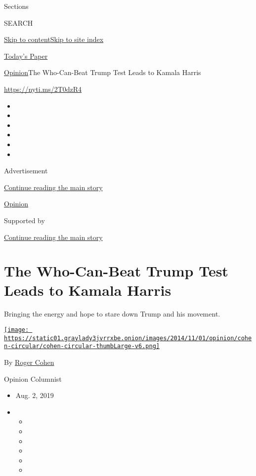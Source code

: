 Sections

SEARCH

\protect\hyperlink{site-content}{Skip to
content}\protect\hyperlink{site-index}{Skip to site index}

\href{https://myaccount.nytimes3xbfgragh.onion/auth/login?response_type=cookie\&client_id=vi}{}

\href{https://www.nytimes3xbfgragh.onion/section/todayspaper}{Today's
Paper}

\href{/section/opinion}{Opinion}\textbar{}The Who-Can-Beat Trump Test
Leads to Kamala Harris

\url{https://nyti.ms/2T0dzR4}

\begin{itemize}
\item
\item
\item
\item
\item
\item
\end{itemize}

Advertisement

\protect\hyperlink{after-top}{Continue reading the main story}

\href{/section/opinion}{Opinion}

Supported by

\protect\hyperlink{after-sponsor}{Continue reading the main story}

\hypertarget{the-who-can-beat-trump-test-leads-to-kamala-harris}{%
\section{The Who-Can-Beat Trump Test Leads to Kamala
Harris}\label{the-who-can-beat-trump-test-leads-to-kamala-harris}}

Bringing the energy and hope to stare down Trump and his movement.

\href{https://www.nytimes3xbfgragh.onion/by/roger-cohen}{\texttt{[image: https://static01.graylady3jvrrxbe.onion/images/2014/11/01/opinion/cohen-circular/cohen-circular-thumbLarge-v6.png]}}

By \href{https://www.nytimes3xbfgragh.onion/by/roger-cohen}{Roger Cohen}

Opinion Columnist

\begin{itemize}
\item
  Aug. 2, 2019
\item
  \begin{itemize}
  \item
  \item
  \item
  \item
  \item
  \item
  \end{itemize}
\end{itemize}

